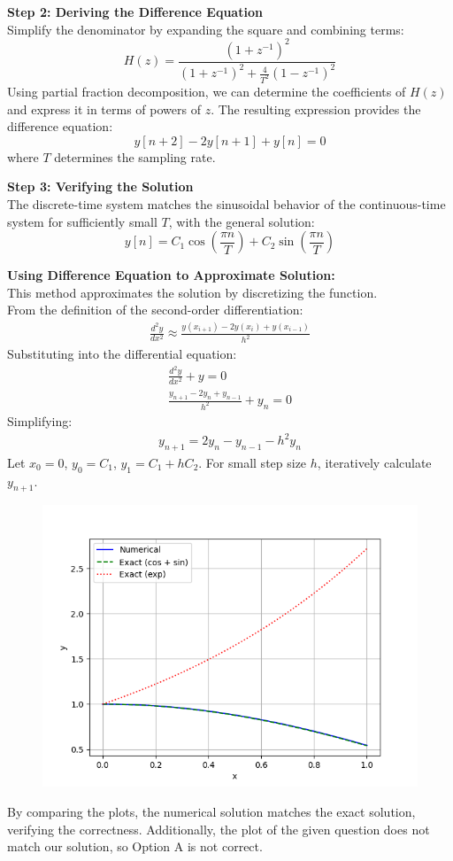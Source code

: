 \documentclass[journal]{IEEEtran}
\begin{document}
	\textbf{Step 2: Deriving the Difference Equation}\\
	Simplify the denominator by expanding the square and combining terms:
	\[
	H(z) = \frac{(1 + z^{-1})^2}{(1 + z^{-1})^2 + \frac{4}{T^2}(1 - z^{-1})^2}
	\]
	Using partial fraction decomposition, we can determine the coefficients of \( H(z) \) and express it in terms of powers of \( z \). The resulting expression provides the difference equation:
	\[
	y[n+2] - 2y[n+1] + y[n] = 0
	\]
	where \( T \) determines the sampling rate.
	
	\textbf{Step 3: Verifying the Solution}\\
	The discrete-time system matches the sinusoidal behavior of the continuous-time system for sufficiently small \( T \), with the general solution:
	\[
	y[n] = C_1 \cos\left( \frac{\pi n}{T} \right) + C_2 \sin\left( \frac{\pi n}{T} \right)
	\]
	
	\textbf{Using Difference Equation to Approximate Solution:}\\
	This method approximates the solution by discretizing the function.\\
	From the definition of the second-order differentiation:
	\begin{align}
		\frac{d^2y}{dx^2} \approx \frac{y(x_{i+1}) - 2y(x_i) + y(x_{i-1})}{h^2}
	\end{align}
	Substituting into the differential equation:
	\begin{align}
		\frac{d^2y}{dx^2} + y = 0 \\
		\frac{y_{n+1} - 2y_n + y_{n-1}}{h^2} + y_n = 0
	\end{align}
	Simplifying:
	\begin{align}
		y_{n+1} = 2y_n - y_{n-1} - h^2y_n
	\end{align}
	Let \( x_0 = 0 \), \( y_0 = C_1 \), \( y_1 = C_1 + hC_2 \). For small step size \( h \), iteratively calculate \( y_{n+1} \).\\
	
	\begin{figure}[h]
		\centering
		\includegraphics[width=\textwidth]{figs/fig.png}
	\end{figure}
	
	By comparing the plots, the numerical solution matches the exact solution, verifying the correctness. Additionally, the plot of the given question does not match our solution, so Option A is not correct.
\end{document}
